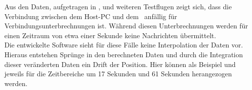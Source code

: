 Aus den Daten, aufgetragen in , und weiteren Testflugen zeigt sich, dass die Verbindung zwischen dem Host-PC und dem \Quad\ anfällig für Verbindungsunterbrechnungen ist. Während diesen Unterbrechnungen werden für einen Zeitraum von etwa einer Sekunde keine Nachrichten übermittelt.\\
Die entwickelte Software sieht für diese Fälle keine Interpolation der Daten vor. Hieraus entstehen Sprünge in den berechneten Daten und durch die Integration dieser veränderten Daten ein Drift der Position. Hier können als Beispiel  und  jeweils für die Zeitbereiche um 17 Sekunden und 61 Sekunden herangezogen werden.







